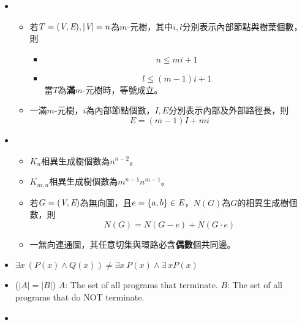 \begin{itemize}
\begin{proof}
\begin{equation}
\begin{aligned}
                & = |\V| - 1 + (m - k) \\
                & \ge |\V| - 1
            \end{aligned}
        \end{equation}
    \end{proof}
    \item \quad\quad
    \begin{itemize}
        \item 若$T = (\textit{V}, \textit{E}), |\textit{V}| = n$為$m$-元樹，其中$i, l$分別表示內部節點與樹葉個數，則\begin{itemize}
            \item \begin{equation}
                n \le mi + 1
            \end{equation}
            \item \begin{equation}
                l \le (m - 1)i + 1
            \end{equation}
            當$T$為\textbf{滿}$m$-元樹時，等號成立。
        \end{itemize}
        \item 一滿$m$-元樹，$i$為內部節點個數，$I, E$分別表示內部及外部路徑長，則\begin{equation}
            E = (m - 1)I + mi
        \end{equation}
    \end{itemize}
    \item \quad\quad
    \begin{itemize}
        \item $K_n$相異生成樹個數為$n^{n - 2}$。
        \item $K_{m, n}$相異生成樹個數為$m^{n - 1}n^{m - 1}$。
        \item 若$G = (\textit{V}, \textit{E})$為無向圖，且$e = \{a, b\} \in \textit{E}$，$N(G)$為$G$的相異生成樹個數，則\begin{equation}
            N(G) = N(G - e) + N(G \cdot e)
        \end{equation}
        \item 一無向連通圖，其任意切集與環路必含\textbf{偶數}個共同邊。
    \end{itemize}
    \item $\exists x\ (P(x) \land Q(x)) \neq \exists x \ P(x) \land \exists \ x P(x)$
    \item ($|A| = |B|$) $A$: The set of all programs that terminate. $B$: The set of all programs that do NOT terminate. 
    \item \quad\quad \begin{itemize}

\end{itemize}
\end{itemize}
